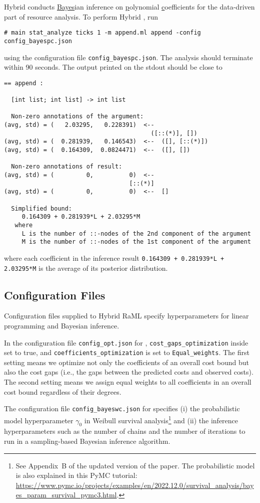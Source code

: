Hybrid \BayesPC{} conducts \underline{Bayes}ian inference on
\underline{p}olynomial \underline{c}oefficients for the data-driven part of
resource analysis.
%
To perform Hybrid \BayesPC{}, run
\begin{verbatim}
# main stat_analyze ticks 1 -m append.ml append -config config_bayespc.json
\end{verbatim}
using the configuration file \texttt{config\_bayespc.json}.
%
The analysis should terminate within 90 seconds.
%
The output printed on the stdout should be close to
\begin{verbatim}
== append :

  [int list; int list] -> int list

  Non-zero annotations of the argument:
(avg, std) = (   2.03295,   0.228391)  <--
                                         ([::(*)], [])
(avg, std) = (  0.281939,   0.146543)  <--  ([], [::(*)])
(avg, std) = (  0.164309,  0.0824471)  <--  ([], [])

  Non-zero annotations of result:
(avg, std) = (         0,          0)  <--
                                   [::(*)]
(avg, std) = (         0,          0)  <--  []

  Simplified bound:
     0.164309 + 0.281939*L + 2.03295*M
   where
     L is the number of ::-nodes of the 2nd component of the argument
     M is the number of ::-nodes of the 1st component of the argument
\end{verbatim}
where each coefficient in the inference result \texttt{0.164309 + 0.281939*L +
  2.03295*M} is the average of its posterior distribution.

\subsection{Configuration Files}

Configuration files supplied to Hybrid RaML specify hyperparameters for
linear programming and Bayesian inference.

In the configuration file \texttt{config\_opt.json} for \Opt{},
\texttt{cost\_gaps\_optimization} inside set to true, and
\texttt{coefficients\_optimization} is set to \texttt{Equal\_weights}.
%
The first setting means we optimize not only the coefficients of an overall cost
bound but also the cost gaps (i.e., the gaps between the predicted costs and
observed costs).
%
The second setting means we assign equal weights to all coefficients in an
overall cost bound regardless of their degrees.

The configuration file \texttt{config\_bayeswc.json} for \BayesWC{} specifies
(i) the probabilistic model hyperparameter $\gamma_0$ in Weibull survival
analysis\footnote{See Appendix~B of the updated version of the paper. The
  probabilistic model is also explained in this PyMC tutorial:
  \url{https://www.pymc.io/projects/examples/en/2022.12.0/survival_analysis/bayes_param_survival_pymc3.html}.}
and (ii) the inference hyperparameters such as the number of chains and the
number of iterations to run in a sampling-based Bayesian inference algorithm.

